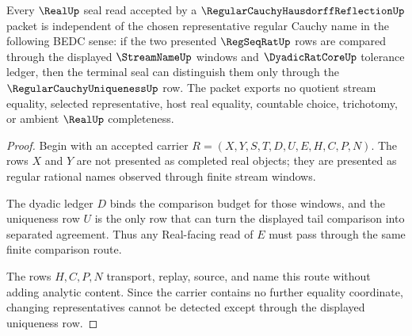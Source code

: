 \begin{theorem}
\label{thm:regular-cauchy-hausdorff-reflection-representative-independence}
Every $\RealUp$ seal read accepted by a $\RegularCauchyHausdorffReflectionUp$ packet is independent of the chosen representative regular Cauchy name in the following BEDC sense: if the two presented $\RegSeqRatUp$ rows are compared through the displayed $\StreamNameUp$ windows and $\DyadicRatCoreUp$ tolerance ledger, then the terminal seal can distinguish them only through the $\RegularCauchyUniquenessUp$ row. The packet exports no quotient stream equality, selected representative, host real equality, countable choice, trichotomy, or ambient $\RealUp$ completeness.
\end{theorem}
\begin{proof}
Begin with an accepted carrier $R=(X,Y,S,T,D,U,E,H,C,P,N)$. The rows $X$ and $Y$ are not presented as completed real objects; they are presented as regular rational names observed through finite stream windows.

The dyadic ledger $D$ binds the comparison budget for those windows, and the uniqueness row $U$ is the only row that can turn the displayed tail comparison into separated agreement. Thus any Real-facing read of $E$ must pass through the same finite comparison route.

The rows $H,C,P,N$ transport, replay, source, and name this route without adding analytic content. Since the carrier contains no further equality coordinate, changing representatives cannot be detected except through the displayed uniqueness row.
\end{proof}

